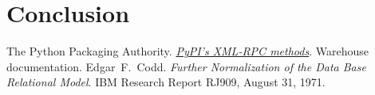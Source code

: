 \documentclass[a4paper,12pt]{article}
\begin{document}
\section{Conclusion}

\begin{thebibliography}{69}
   The Python Packaging Authority.
    \href{https://warehouse.readthedocs.io/api-reference/xml-rpc}
         {\emph{PyPI’s XML-RPC methods}}.
    Warehouse documentation.
   Edgar~F.~Codd.
    \emph{Further Normalization of the Data Base Relational Model}.
    IBM Research Report RJ909, August 31, 1971.
\end{thebibliography}
\end{document}
